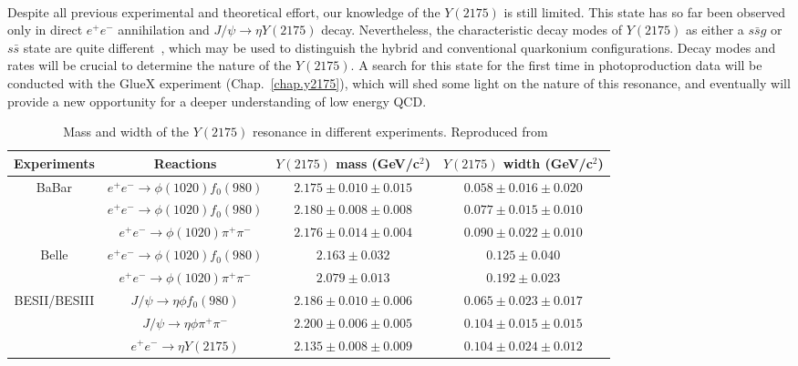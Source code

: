~\par Despite all previous experimental and theoretical effort, our knowledge of the $Y(2175)$ is still limited. This state has so far been observed only in direct $e^{+}e^{-}$ annihilation and $J/\psi \rightarrow \eta Y(2175)$ decay. Nevertheless, the characteristic decay modes of $Y(2175)$ as either a $s\bar{s}g$ or $s\bar{s}$ state are quite different~\cite{Gui07, Isgur85}, which may be used to distinguish the hybrid and conventional quarkonium configurations. Decay modes and rates will be crucial to determine the nature of the $Y(2175)$. A search for this state for the first time in photoproduction data will be conducted with the GlueX experiment (Chap.~\ref{chap.y2175}), which will shed some light on the nature of this resonance, and eventually will provide a new opportunity for a deeper understanding of low energy QCD.

\begin{table}[H]
    \centering
    \small
    \setlength{\tabcolsep}{3pt}
    \caption{Mass and width of the $Y(2175)$ resonance in different experiments. Reproduced from~\cite{Aubert06, Aubert12, Shen09, Ablikim08, Ablikim15, Ablikim19}}
    \label{tab.1.4}
    \begin{tabular}{|c|c|c|c|}
        \hline
        Experiments & Reactions & \thead{$Y(2175)$ mass\\(GeV/c$^2$)} & \thead{$Y(2175)$ width \\(GeV/c$^2$)} \\
        \hline
        \multirow{3}{*}{BaBar} 
        & $e^{+}e^{-}\rightarrow \phi(1020)f_0(980)$ & $2.175 \pm 0.010 \pm 0.015$ & $0.058 \pm 0.016 \pm 0.020$ \\ 
        & $e^{+}e^{-}\rightarrow \phi(1020)f_0(980)$ & $2.180 \pm 0.008 \pm 0.008$ & $0.077 \pm 0.015 \pm 0.010$ \\ 
        & $e^{+}e^{-}\rightarrow \phi(1020)\pi^{+}\pi^{-}$ & $2.176 \pm 0.014 \pm 0.004$ & $0.090 \pm 0.022 \pm 0.010$ \\ 
        \hline
        \multirow{2}{*}{Belle}
        & $e^{+}e^{-}\rightarrow \phi(1020)f_0(980)$ & $2.163 \pm 0.032$ & $0.125 \pm 0.040$ \\ 
        & $e^{+}e^{-}\rightarrow \phi(1020)\pi^{+}\pi^{-}$ & $2.079 \pm 0.013$ & $0.192 \pm 0.023$ \\
        \hline
        \multirow{2}{*}{BESII/BESIII}
        & $J/\psi \rightarrow \eta \phi f_0(980)$ & $2.186 \pm 0.010 \pm 0.006$ & $0.065 \pm 0.023 \pm 0.017$ \\ 
        & $J/\psi \rightarrow \eta \phi \pi^{+}\pi^{-}$ & $2.200 \pm 0.006 \pm 0.005$ & $0.104 \pm 0.015 \pm 0.015$ \\ 
        & $e^{+}e^{-}\rightarrow \eta Y(2175)$ & $2.135 \pm 0.008 \pm 0.009$ & $0.104 \pm 0.024 \pm 0.012$ \\ 
        \hline
    \end{tabular}
\end{table}

